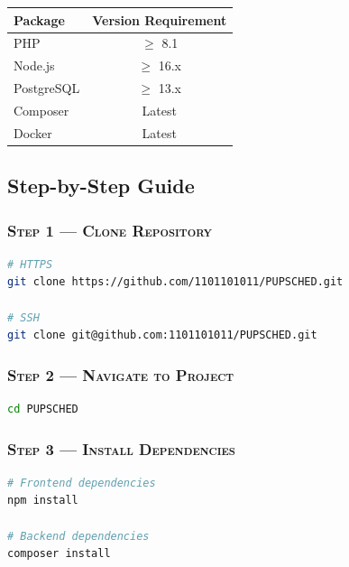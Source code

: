 \documentclass[12pt,letterpaper]{article}
\begin{document}
\begin{center}
\renewcommand{\arraystretch}{1.3}
\setlength{\tabcolsep}{12pt}
\begin{tabular}{|l|c|}
\hline
\textbf{Package} & \textbf{Version Requirement} \\
\hline
PHP         & $\geq$ 8.1 \\
Node.js     & $\geq$ 16.x \\
PostgreSQL  & $\geq$ 13.x \\
Composer    & Latest \\
Docker    & Latest \\
\hline
\end{tabular}
\end{center}

\captionsetup{type=table}
\caption{\textit{Required packages for the development environment.}}

\vspace{1.5em}

\subsection*{Step-by-Step Guide}

\subsubsection*{\textsc{Step 1 — Clone Repository}}
\begin{lstlisting}[language=bash]
# HTTPS
git clone https://github.com/1101101011/PUPSCHED.git

# SSH
git clone git@github.com:1101101011/PUPSCHED.git
\end{lstlisting}

\subsubsection*{\textsc{Step 2 — Navigate to Project}}
\begin{lstlisting}[language=bash]
cd PUPSCHED
\end{lstlisting}

\subsubsection*{\textsc{Step 3 — Install Dependencies}}
\begin{lstlisting}[language=bash]
# Frontend dependencies
npm install

# Backend dependencies
composer install
\end{lstlisting}
\end{document}
